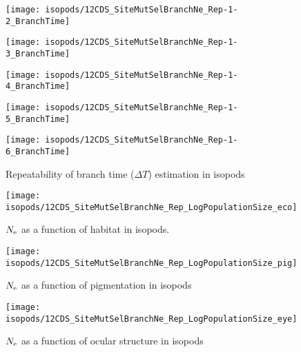\begin{figure}[H]
    \centering
    \begin{minipage}{0.32\linewidth}
        \texttt{[image: isopods/12CDS\_SiteMutSelBranchNe\_Rep-1-2\_BranchTime]}
    \end{minipage} \hfill
    \begin{minipage}{0.32\linewidth}
        \texttt{[image: isopods/12CDS\_SiteMutSelBranchNe\_Rep-1-3\_BranchTime]}
    \end{minipage} \hfill
    \begin{minipage}{0.32\linewidth}
        \texttt{[image: isopods/12CDS\_SiteMutSelBranchNe\_Rep-1-4\_BranchTime]}
    \end{minipage}
    \begin{minipage}{0.32\linewidth}
        \texttt{[image: isopods/12CDS\_SiteMutSelBranchNe\_Rep-1-5\_BranchTime]}
    \end{minipage}
    \begin{minipage}{0.32\linewidth}
        \texttt{[image: isopods/12CDS\_SiteMutSelBranchNe\_Rep-1-6\_BranchTime]}
    \end{minipage}
    \caption[Repeatability of branch time estimation in isopods]{Repeatability of branch time ($\Delta T$) estimation in isopods}
\end{figure}

\begin{figure}[H]
    \centering
    \texttt{[image: isopods/12CDS\_SiteMutSelBranchNe\_Rep\_LogPopulationSize\_eco]}
    \caption[$\Ne$ as a function of habitat in isopods]{$\Ne$ as a function of habitat in isopods.}
\end{figure}


\begin{figure}[H]
    \centering
    \texttt{[image: isopods/12CDS\_SiteMutSelBranchNe\_Rep\_LogPopulationSize\_pig]}
    \caption[$\Ne$ as a function of pigmentation in isopods]{$\Ne$ as a function of pigmentation in isopods}
\end{figure}


\begin{figure}[H]
    \centering
    \texttt{[image: isopods/12CDS\_SiteMutSelBranchNe\_Rep\_LogPopulationSize\_eye]}
    \caption[$\Ne$ as a function of ocular structure in isopods]{$\Ne$ as a function of ocular structure in isopods}
\end{figure}


